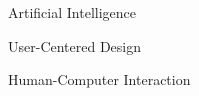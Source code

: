 
\Large
Artificial Intelligence

\vspace{10.00mm}

\Large
User-Centered Design

\vspace{10.00mm}

\Large
Human-Computer Interaction